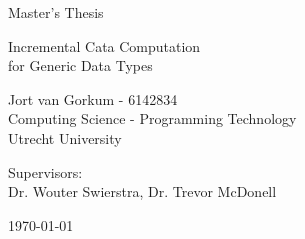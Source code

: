 \begin{titlepage}
    \fontsize{12pt}{15pt}\selectfont
    \begin{center}
      \vspace*{4cm}
  
      Master's Thesis
  
      \vspace{0.5cm}
  
      {
        \fontsize{20.74pt}{20.74pt}\selectfont
        \parbox[]{13cm} {
          \centering
          Incremental Cata Computation \\ for Generic Data Types
        }
      }
        
      \vspace{1.25cm}
      
      Jort van Gorkum - 6142834 \\
      Computing Science - Programming Technology \\
      Utrecht University \\
      
      \vspace{1.25cm}
      
      Supervisors: \\
      Dr. Wouter Swierstra, Dr. Trevor McDonell \\
      
      \vspace{1cm}
  
      \today
    \end{center}
  \end{titlepage}